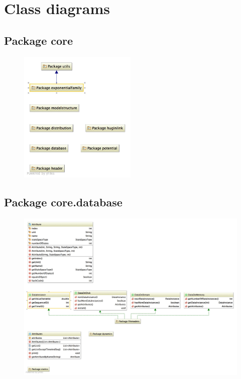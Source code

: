\newpage
\section*{Class diagrams}
\label{sec:classDiagrams}

\subsection{Package core}
\begin{figure}[H]
  \centering
    \includegraphics[width=0.5\textwidth]{ClassDiagrams/core.jpg}
\end{figure}

\subsection{Package core.database}
\begin{figure}[H]
  \centering
    \includegraphics[width=\textwidth]{ClassDiagrams/core_database.jpg}
\end{figure}

